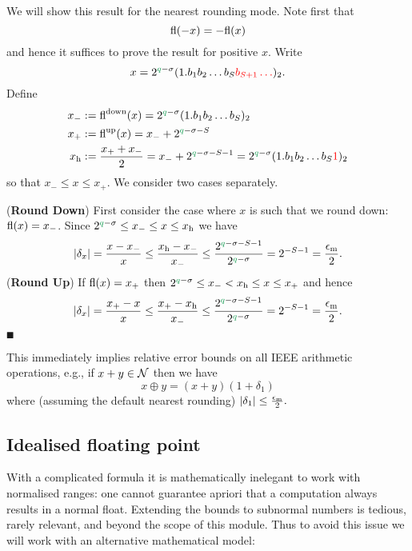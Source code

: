 We will show this result for the nearest rounding mode. Note first that
\[
{\rm fl}(-x) = -{\rm fl}(x)
\]
and hence it suffices to prove the result for positive $x$. Write
\[
x = 2^{\green{q}-\ensuremath{\sigma}} (1.b_1b_2\ensuremath{\ldots}b_S\red{b_{S+1}\ensuremath{\ldots}})_2.
\]
Define
\begin{align*}
x_- &:= {\rm fl}^{\rm down}(x) = 2^{\green{q}-\ensuremath{\sigma}} (1.b_1b_2\ensuremath{\ldots}b_S)_2 \\
x_+ &:= {\rm fl}^{\rm up}(x) = x_- + 2^{\green{q}-\ensuremath{\sigma}-S} \\
x_{\rm h} &:= {x_+ + x_- \over 2} = x_- + 2^{\green{q}-\ensuremath{\sigma}-S-1} = 2^{\green{q}-\ensuremath{\sigma}} (1.b_1b_2\ensuremath{\ldots}b_S\red{1})_2
\end{align*}
so that $x_- \ensuremath{\leq} x \ensuremath{\leq} x_+$. We consider two cases separately.

(\textbf{Round Down}) First consider the case where $x$ is such that we round down: ${\rm fl}(x) = x_-$. Since $2^{\green{q}-\ensuremath{\sigma}} \ensuremath{\leq} x_- \ensuremath{\leq} x \ensuremath{\leq} x_{\rm h}$ we have
\[
|\ensuremath{\delta}_x| = {x - x_- \over x} \ensuremath{\leq} {x_{\rm h} - x_- \over x_-} \ensuremath{\leq} {2^{\green{q}-\ensuremath{\sigma}-S-1} \over 2^{\green{q}-\ensuremath{\sigma}}} = 2^{-S-1} = {\ensuremath{\epsilon}_{\rm m} \over 2}.
\]
(\textbf{Round Up}) If ${\rm fl}(x) = x_+$ then $2^{\green{q}-\ensuremath{\sigma}} \ensuremath{\leq} x_- < x_{\rm h} \ensuremath{\leq} x \ensuremath{\leq} x_+$ and hence
\[
|\ensuremath{\delta}_x| = {x_+ - x \over x} \ensuremath{\leq} {x_+ - x_{\rm h} \over x_-} \ensuremath{\leq} {2^{\green{q}-\ensuremath{\sigma}-S-1} \over 2^{\green{q}-\ensuremath{\sigma}}} = 2^{-S-1} = {\ensuremath{\epsilon}_{\rm m} \over 2}.
\]
\ensuremath{\QED}

This immediately implies relative error bounds on all IEEE arithmetic operations, e.g., if $x+y \in {\cal N}$ then we have
\[
x \ensuremath{\oplus} y = (x+y) (1 + \ensuremath{\delta}_1)
\]
where (assuming the default nearest rounding) $|\ensuremath{\delta}_1| \ensuremath{\leq} {\ensuremath{\epsilon}_{\rm m} \over 2}.$

\subsection{Idealised floating point}
With a complicated formula it is mathematically inelegant to work with normalised ranges: one cannot guarantee apriori that a computation always results in a normal float. Extending the bounds to subnormal numbers is tedious, rarely relevant, and beyond the scope of this module. Thus to avoid this issue we will work with an alternative mathematical model:

